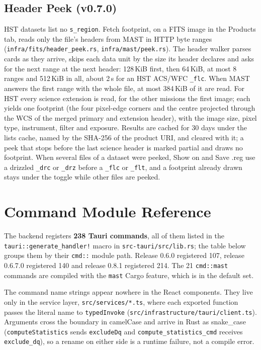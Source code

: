 \documentclass[11pt,a4paper]{article}
\newcommand{\code}[1]{\texttt{\small #1}}
\newcommand{\nCommands}{238}
\begin{document}
    \subsection{Header Peek (v0.7.0)}

    HST datasets list no \code{s\_region}. Fetch footprint, on a FITS image in the Products tab, reads only the file's headers from MAST in HTTP byte ranges (\code{infra/fits/header\_peek.rs}, \code{infra/mast/peek.rs}). The header walker parses cards as they arrive, skips each data unit by the size its header declares and asks for the next range at the next header: 128\,KiB first, then 64\,KiB, at most 8 ranges and 512\,KiB in all, about 2\,s for an HST ACS/WFC \code{\_flc}. When MAST answers the first range with the whole file, at most 384\,KiB of it are read. For HST every science extension is read, for the other missions the first image; each yields one footprint (the four pixel-edge corners and the centre projected through the WCS of the merged primary and extension header), with the image size, pixel type, instrument, filter and exposure. Results are cached for 30 days under the lists cache, named by the SHA-256 of the product URI, and cleared with it; a peek that stops before the last science header is marked partial and draws no footprint. When several files of a dataset were peeked, Show on and Save .reg use a drizzled \code{\_drc} or \code{\_drz} before a \code{\_flc} or \code{\_flt}, and a footprint already drawn stays under the toggle while other files are peeked.

    \section{Command Module Reference}
    \label{sec:commands}

    The backend registers \textbf{\nCommands{} Tauri commands}, all of them listed in the \code{tauri::generate\_handler!} macro in \code{src-tauri/src/lib.rs}; the table below groups them by their \code{cmd::} module path. Release 0.6.0 registered 107, release 0.6.7.0 registered 140 and release 0.8.1 registered 214. The 21 \code{cmd::mast} commands are compiled with the \code{mast} Cargo feature, which is in the default set.

    The command name strings appear nowhere in the React components. They live only in the service layer, \code{src/services/*.ts}, where each exported function passes the literal name to \code{typedInvoke} (\code{src/infrastructure/tauri/client.ts}). Arguments cross the boundary in camelCase and arrive in Rust as snake\_case (\code{computeStatistics} sends \code{excludeDq} and \code{compute\_statistics\_cmd} receives \code{exclude\_dq}), so a rename on either side is a runtime failure, not a compile error.
\end{document}
